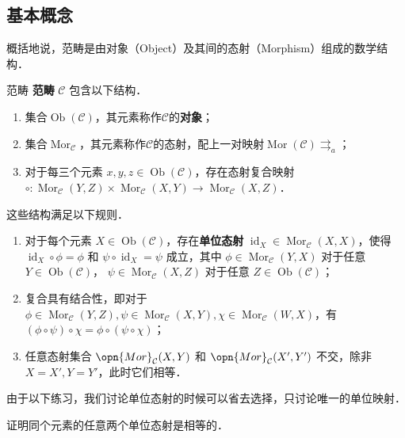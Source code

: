 
\begin{issues}
\issueMissDepend
\issueNeedCite
\issueAbstract
\end{issues}

\subsection{基本概念}
概括地说，范畴是由对象（Object）及其间的态射（Morphism）组成的数学结构．
\begin{definition}{范畴}
\textbf{范畴} $\mathcal{C}$ 包含以下结构．
\begin{enumerate}
    \item 集合$\operatorname{Ob}(\mathcal{C})$，其元素称作$\mathcal{C}$的\textbf{对象}；
    \item 集合$\operatorname{Mor}_{\mathcal{C}}$，其元素称作$\mathcal{C}$的态射，配上一对映射$\operatorname{Mor}(\mathcal{C})\rightrightarrows_{a}$；
    \item 对于每三个元素 $x,y,z\in\operatorname{Ob}(\mathcal{C})$，存在态射复合映射 ${\circ}:\operatorname{Mor}_\mathcal{C}(Y,Z)\times\operatorname{Mor}_{\mathcal{C}}(X,Y)\to\operatorname{Mor}_\mathcal{C}(X,Z)$．
\end{enumerate}
这些结构满足以下规则．
\begin{enumerate}
    \item 对于每个元素 $X\in\operatorname{Ob}(\mathcal{C})$，存在\textbf{单位态射} $\operatorname{id}_X\in\operatorname{Mor}_\mathcal{C}(X,X)$，使得 $\operatorname{id}_X\circ\phi=\phi$ 和 $\psi\circ\operatorname{id}_X=\psi$ 成立，其中 $\phi\in\operatorname{Mor}_\mathcal{C}(Y,X)$ 对于任意 $Y\in\operatorname{Ob}(\mathcal{C})$， $\psi\in\operatorname{Mor}_\mathcal{C}(X,Z)$ 对于任意 $Z\in\operatorname{Ob}(\mathcal{C})$；
    \item 复合具有结合性，即对于 $\phi\in\operatorname{Mor}_\mathcal{C}(Y,Z),\psi\in\operatorname{Mor}_\mathcal{C}(X,Y),\chi\in\operatorname{Mor}_\mathcal{C}(W,X)$，有 $(\phi\circ\psi)\circ\chi=\phi\circ(\psi\circ\chi)$；
    \item 任意态射集合 $\opn{Mor}_\mathcal{C}(X,Y)$ 和 $\opn{Mor}_\mathcal{C}(X',Y')$ 不交，除非 $X=X',Y=Y'$，此时它们相等．
\end{enumerate}
\end{definition}
由于以下练习，我们讨论单位态射的时候可以省去选择，只讨论唯一的单位映射．
\begin{exercise}{}
证明同个元素的任意两个单位态射是相等的．
\end{exercise}
